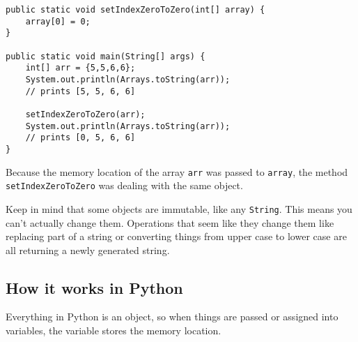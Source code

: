 \begin{verbatim}
public static void setIndexZeroToZero(int[] array) {
	array[0] = 0;
}

public static void main(String[] args) {
	int[] arr = {5,5,6,6};
	System.out.println(Arrays.toString(arr));
	// prints [5, 5, 6, 6]
	
	setIndexZeroToZero(arr);
	System.out.println(Arrays.toString(arr));
	// prints [0, 5, 6, 6]
}

\end{verbatim}

Because the memory location of the array \texttt{arr} was passed to \texttt{array}, the method \texttt{setIndexZeroToZero} was dealing with the same object. 


Keep in mind that some objects are immutable, like any \texttt{String}.  This means you can't actually change them.  Operations that seem like they change them like replacing part of a string or converting things from upper case to lower case are all returning a newly generated string.
\subsection{How it works in Python}

Everything in Python is an object, so when things are passed or assigned into variables, the variable stores the memory location.